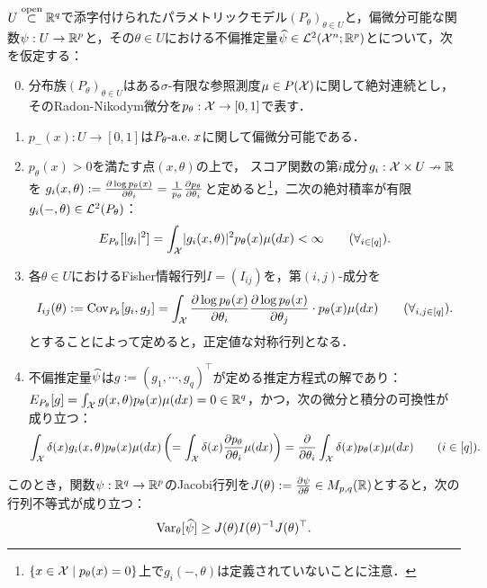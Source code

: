 \documentclass[uplatex, dvipdfmx]{jsarticle}
\begin{document}
\begin{theorem}\label{thm-Cramer-Rao}
    $U\overset{\mathrm{open}}{\subset}\mathbb{R}^q$で添字付けられたパラメトリックモデル$(P_\theta)_{\theta\in U}$と，偏微分可能な関数$\psi:U\to\mathbb{R}^p$と，その$\theta\in U$における不偏推定量$\widehat{\psi}\in\mathcal{L}^2(\mathcal{X}^n;\mathbb{R}^p)$とについて，次を仮定する：
    \begin{enumerate}[({P}1)]\setcounter{enumi}{-1}
        \item 分布族$(P_\theta)_{\theta\in U}$はある$\sigma$-有限な参照測度$\mu\in P(\mathcal{X})$に関して絶対連続とし，そのRadon-Nikodym微分を$p_\theta:\mathcal{X}\to[0,1]$で表す．
        \item $p_-(x):U\to[0,1]$は$P_\theta\text{-a.e.}\; x$に関して偏微分可能である．
        \item $p_\theta(x)>0$を満たす点$(x,\theta)$の上で，
        スコア関数の第$i$成分$g_i:\mathcal{X}\times U\nrightarrow\mathbb{R}$を
        $g_i(x,\theta):=\frac{\partial \log p_\theta(x)}{\partial \theta_i}=\frac{1}{p_\theta}\frac{\partial p_\theta}{\partial \theta_i}$と定めると\footnote{$\left\{x\in\mathcal{X}\mid p_\theta(x)=0\right\}$上で$g_i(-,\theta)$は定義されていないことに注意．}，二次の絶対積率が有限$g_i(-,\theta)\in\mathcal{L}^2(P_\theta)$：
        \[E_{P_\theta}[\lvert g_i\rvert^2]=\int_{\mathcal{X}}\lvert g_i(x,\theta)\rvert^2p_\theta(x)\mu(dx)<\infty\qquad(\forall_{i\in[q]}).\]
        \item 各$\theta\in U$におけるFisher情報行列$I=(I_{ij})$を，第$(i,j)$-成分を
        \[I_{ij}(\theta):=\mathrm{Cov}_{P_\theta}[g_i,g_j]=\int_{\mathcal{X}}\frac{\partial \log p_\theta(x)}{\partial \theta_i}\frac{\partial \log p_\theta(x)}{\partial \theta_j}\cdot p_\theta(x)\mu(dx)\qquad(\forall_{i,j\in[q]}).\]
        とすることによって定めると，正定値な対称行列となる．
        \item 不偏推定量$\widehat{\psi}$は$g:=(g_1,\cdots,g_q)^\top$が定める推定方程式の解であり：
        $E_{P_\theta}[g]=\int_{\mathcal{X}} g(x,\theta)p_\theta(x)\mu(dx)=0\in\mathbb{R}^q$，かつ，次の微分と積分の可換性が成り立つ：
        \[\int_{\mathcal{X}}\delta(x)g_i(x,\theta)p_\theta(x)\mu(dx)\left(=\int_{\mathcal{X}}\delta(x)\frac{\partial p_\theta}{\partial \theta_i}\mu(dx)\right)=\frac{\partial }{\partial \theta_i}\int_{\mathcal{X}}\delta(x)p_\theta(x)\mu(dx)\qquad(i\in[q]).\]
    \end{enumerate}
    このとき，関数$\psi:\mathbb{R}^q\to\mathbb{R}^p$のJacobi行列を$J(\theta):=\frac{\partial \psi}{\partial \theta}\in M_{p,q}(\mathbb{R})$とすると，次の行列不等式が成り立つ：
    \[\mathrm{Var}_\theta[\widehat{\psi}]\ge J(\theta)I(\theta)^{-1}J(\theta)^\top.\]
\end{theorem}
\end{document}
